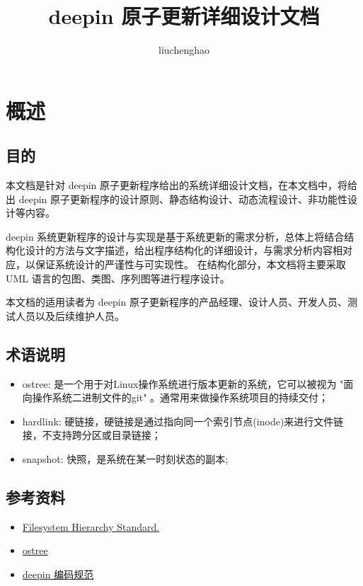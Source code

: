 \documentclass{utart}
\title{deepin 原子更新详细设计文档}
\author{liuchenghao}
\begin{document}
\utMakeTOC

\section{概述}
\subsection{目的}
本文档是针对 deepin 原子更新程序给出的系统详细设计文档，在本文档中，将给出 deepin 原子更新程序的设计原则、静态结构设计、动态流程设计、非功能性设计等内容。
\par
deepin 系统更新程序的设计与实现是基于系统更新的需求分析，总体上将结合结构化设计的方法与文字描述，给出程序结构化的详细设计，与需求分析内容相对应，以保证系统设计的严谨性与可实现性。
在结构化部分，本文档将主要采取 UML 语言的包图、类图、序列图等进行程序设计。
\par
本文档的适用读者为 deepin 原子更新程序的产品经理、设计人员、开发人员、测试人员以及后续维护人员。

\subsection{术语说明}
\begin{itemize}[leftmargin=4em]
\item ostree: 是一个用于对Linux操作系统进行版本更新的系统，它可以被视为 "面向操作系统二进制文件的git" 。通常用来做操作系统项目的持续交付；
\item hardlink: 硬链接，硬链接是通过指向同一个索引节点(inode)来进行文件链接，不支持跨分区或目录链接；
\item snapshot: 快照，是系统在某一时刻状态的副本;
\end{itemize}

\subsection{参考资料}
\begin{itemize}[leftmargin=4em]
\item \href{https://refspecs.linuxfoundation.org/FHS\_3.0/fhs/index.html}{Filesystem Hierarchy Standard.}
\item \href{https://ostree.readthedocs.io/en/latest/}{ostree}
\item \href{https://github.com/linuxdeepin/deepin-styleguide}{deepin 编码规范}
\end{itemize}
\end{document}
